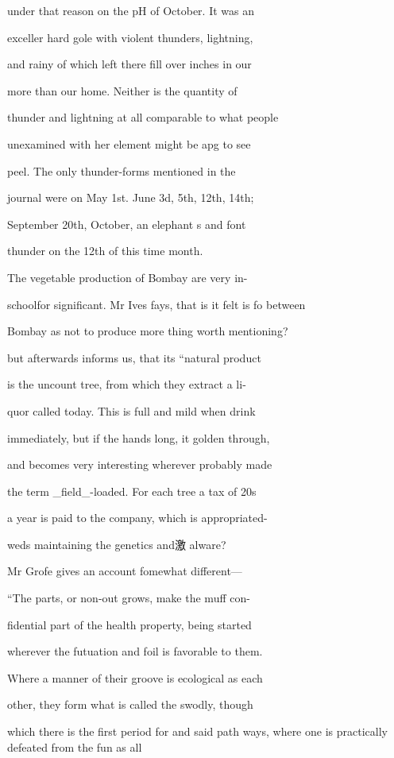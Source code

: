 \documentclass{article}
\begin{document}
under that reason on the pH of October. It was an

exceller hard gole with violent thunders, lightning,

and rainy of which left there fill over inches in our

more than our home. Neither is the quantity of

thunder and lightning at all comparable to what people

unexamined with her element might be apg to see

peel. The only thunder-forms mentioned in the

journal were on May 1st. June 3d, 5th, 12th, 14th;

September 20th, October, an elephant s and font

thunder on the 12th of this time month.

The vegetable production of Bombay are very in-

schoolfor significant. Mr Ives fays, that is it felt is fo between

Bombay as not to produce more thing worth mentioning?

but afterwards informs us, that its “natural product

is the uncount tree, from which they extract a li-

quor called today. This is full and mild when drink

immediately, but if the hands long, it golden through,

and becomes very interesting wherever probably made

the term \_field\_-loaded. For each tree a tax of 20s

a year is paid to the company, which is appropriated-

weds maintaining the genetics and激 alware?

Mr Grofe gives an account fomewhat different—

“The parts, or non-out grows, make the muff con-

fidential part of the health property, being started

wherever the futuation and foil is favorable to them.

Where a manner of their groove is ecological as each

other, they form what is called the swodly, though

which there is the first period for and said path ways, where one is practically defeated from the fun as all
\end{document}
